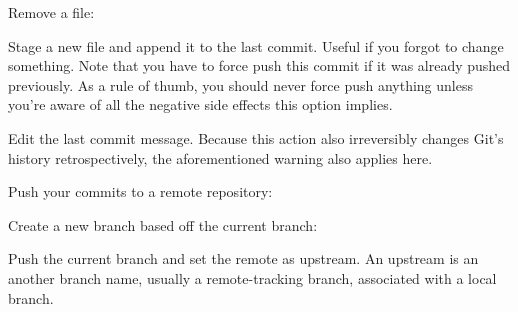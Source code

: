 \begin{flushleft}
	Remove a file:
\end{flushleft}

\begin{flushleft}
\end{flushleft}

\begin{flushleft}
	Stage a new file and append it to the last commit. Useful if you forgot to
	change something. Note that you have to force push this commit if it was
	already pushed previously. As a rule of thumb, you should never force push
	anything unless you're aware of all the negative side effects this option
	implies.
\end{flushleft}

\begin{flushleft}
\end{flushleft}
\vspace{-0.4cm}
\begin{flushleft}
\end{flushleft}

\begin{flushleft}
	Edit the last commit message. Because this action also irreversibly changes
	Git's history retrospectively, the aforementioned warning also applies here.
\end{flushleft}

\begin{flushleft}
\end{flushleft}

\begin{flushleft}
	Push your commits to a remote repository:
\end{flushleft}

\begin{flushleft}
\end{flushleft}

\begin{flushleft}
	Create a new branch based off the current branch:
\end{flushleft}

\begin{flushleft}
\end{flushleft}

\begin{flushleft}
	Push the current branch and set the remote as upstream. An upstream is an another
	branch name, usually a remote-tracking branch, associated with a local branch.
\end{flushleft}

\begin{flushleft}
\end{flushleft}
